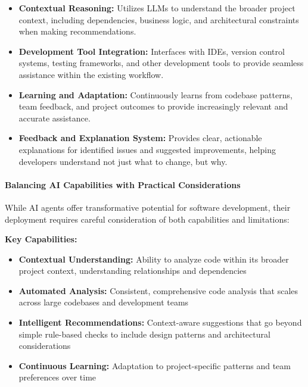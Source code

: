 \begin{spacing}{1.2}
\begin{itemize}
    \item \textbf{Contextual Reasoning:} Utilizes LLMs to understand the broader project context, including dependencies, business logic, and architectural constraints when making recommendations.
    
    \item \textbf{Development Tool Integration:} Interfaces with IDEs, version control systems, testing frameworks, and other development tools to provide seamless assistance within the existing workflow.
    
    \item \textbf{Learning and Adaptation:} Continuously learns from codebase patterns, team feedback, and project outcomes to provide increasingly relevant and accurate assistance.
    
    \item \textbf{Feedback and Explanation System:} Provides clear, actionable explanations for identified issues and suggested improvements, helping developers understand not just what to change, but why.
\end{itemize}


\paragraph{Balancing AI Capabilities with Practical Considerations}

While AI agents offer transformative potential for software development, their deployment requires careful consideration of both capabilities and limitations:

\textbf{Key Capabilities:}
\begin{itemize}
    \item \textbf{Contextual Understanding:} Ability to analyze code within its broader project context, understanding relationships and dependencies
    \item \textbf{Automated Analysis:} Consistent, comprehensive code analysis that scales across large codebases and development teams
    \item \textbf{Intelligent Recommendations:} Context-aware suggestions that go beyond simple rule-based checks to include design patterns and architectural considerations
    \item \textbf{Continuous Learning:} Adaptation to project-specific patterns and team preferences over time
\end{itemize}


\end{spacing}
